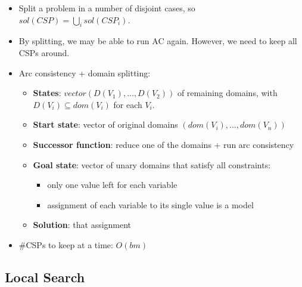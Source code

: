 \documentclass{article}
\begin{document}
\begin{itemize}
    \item Split a problem in a number of disjoint cases, so $sol(CSP) = \bigcup\limits_{i} sol(CSP_i)$.
    \item By splitting, we may be able to run AC again. However, we need to keep all CSPs around.
    \item Arc consistency + domain splitting:
        \begin{itemize}
            \item \textbf{States}: $vector(D(V_1), \ldots, D(V_2))$ of remaining domains, with $D(V_i) \subseteq dom(V_i)$ for each $V_i$.
            \item \textbf{Start state}: vector of original domains $(dom(V_i), \ldots, dom(V_n))$
            \item \textbf{Successor function}: reduce one of the domains + run arc consistency
            \item \textbf{Goal state}: vector of unary domains that satisfy all constraints:
                \begin{itemize}
                    \item only one value left for each variable
                    \item assignment of each variable to its single value is a model
                \end{itemize}
            \item \textbf{Solution}: that assignment
        \end{itemize}
    \item \#CSPs to keep at a time: $O(bm)$
\end{itemize}

\subsection{Local Search}
\end{document}
